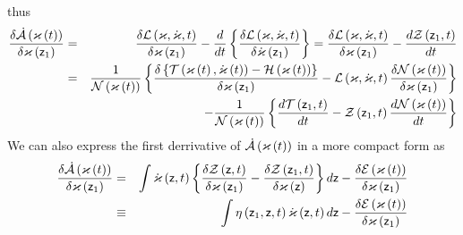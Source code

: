 thus 
\begin{eqnarray}
\frac{\delta {\cal \dot{A}}\left( \varkappa \left( t\right) \right) }{\delta
\varkappa \left( {\sf z}_{1}\right) } &=&\frac{\delta {\cal L}\left( {\cal %
\varkappa },{\cal \dot{\varkappa}},t\right) }{\delta {\cal \varkappa }\left( 
{\sf z}_{1}\right) }-\frac{d}{dt}\left\{ \frac{\delta {\cal L}\left( {\cal %
\varkappa },{\cal \dot{\varkappa}},t\right) }{\delta {\cal \dot{\varkappa}}%
\left( {\sf z}_{1}\right) }\right\} =\frac{\delta {\cal L}\left( {\cal %
\varkappa },{\cal \dot{\varkappa}},t\right) }{\delta {\cal \varkappa }\left( 
{\sf z}_{1}\right) }-\frac{d{\cal Z}\left( {\sf z}_{1},t\right) }{dt} 
\nonumber \\
&=&\frac{1}{{\cal N}\left( {\cal \varkappa }\left( t\right) \right) }\left\{ 
\frac{\delta \left\{ {\cal T}\left( {\cal \varkappa }\left( t\right) ,{\cal 
\dot{\varkappa}}\left( t\right) \right) -{\cal H}\left( {\cal \varkappa }%
\left( t\right) \right) \right\} }{\delta {\cal \varkappa }\left( {\sf z}%
_{1}\right) }-{\cal L}\left( {\cal \varkappa },{\cal \dot{\varkappa}}%
,t\right) \frac{\delta {\cal N}\left( {\cal \varkappa }\left( t\right)
\right) }{\delta {\cal \varkappa }\left( {\sf z}_{1}\right) }\right\} 
\nonumber \\
&&-\frac{1}{{\cal N}\left( {\cal \varkappa }\left( t\right) \right) }\left\{ 
\frac{d{\cal T}\left( {\sf z}_{1},t\right) }{dt}-{\cal Z}\left( {\sf z}%
_{1},t\right) \frac{d{\cal N}\left( {\cal \varkappa }\left( t\right) \right) 
}{dt}\right\}
\end{eqnarray}%
We can also express the first derrivative of ${\cal \dot{A}}\left( \varkappa
\left( t\right) \right) $ in a more compact form as 
\begin{eqnarray}
\frac{\delta {\cal \dot{A}}\left( \varkappa \left( t\right) \right) }{\delta
\varkappa \left( {\sf z}_{1}\right) } &=&\int {\cal \dot{\varkappa}}\left( 
{\sf z},t\right) \left\{ \frac{\delta {\cal Z}\left( {\sf z},t\right) }{%
\delta \varkappa \left( {\sf z}_{1}\right) }-\frac{\delta {\cal Z}\left( 
{\sf z}_{1},t\right) }{\delta {\cal \varkappa }\left( {\sf z}\right) }%
\right\} d{\sf z}-\frac{\delta {\cal E}\left( {\cal \varkappa }\left(
t\right) \right) }{\delta \varkappa \left( {\sf z}_{1}\right) } \\
&\equiv &\int \eta \left( {\sf z}_{1},{\sf z},t\right) {\cal \dot{\varkappa}}%
\left( {\sf z},t\right) d{\sf z}-\frac{\delta {\cal E}\left( {\cal \varkappa 
}\left( t\right) \right) }{\delta \varkappa \left( {\sf z}_{1}\right) }
\end{eqnarray}%
